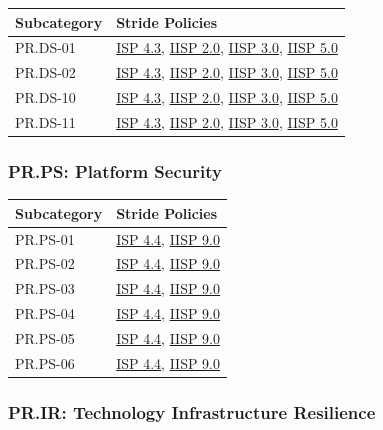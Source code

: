 \documentclass[11pt,landscape]{article}
\begin{document}
\begin{tabularx}{\textwidth}{|p{3.5cm}|X|}
\hline
\rowcolor{headgray} \textbf{Subcategory} & \textbf{Stride Policies} \\
\hline
PR.DS-01 & \hyperref[pol:ISP43]{ISP 4.3}, \hyperref[pol:IISP20]{IISP 2.0}, \hyperref[pol:IISP30]{IISP 3.0}, \hyperref[pol:IISP50]{IISP 5.0} \\
\hline
PR.DS-02 & \hyperref[pol:ISP43]{ISP 4.3}, \hyperref[pol:IISP20]{IISP 2.0}, \hyperref[pol:IISP30]{IISP 3.0}, \hyperref[pol:IISP50]{IISP 5.0} \\
\hline
PR.DS-10 & \hyperref[pol:ISP43]{ISP 4.3}, \hyperref[pol:IISP20]{IISP 2.0}, \hyperref[pol:IISP30]{IISP 3.0}, \hyperref[pol:IISP50]{IISP 5.0} \\
\hline
PR.DS-11 & \hyperref[pol:ISP43]{ISP 4.3}, \hyperref[pol:IISP20]{IISP 2.0}, \hyperref[pol:IISP30]{IISP 3.0}, \hyperref[pol:IISP50]{IISP 5.0} \\
\hline
\end{tabularx}

\subsubsection{PR.PS: Platform Security}

\begin{tabularx}{\textwidth}{|p{3.5cm}|X|}
\hline
\rowcolor{headgray} \textbf{Subcategory} & \textbf{Stride Policies} \\
\hline
PR.PS-01 & \hyperref[pol:ISP44]{ISP 4.4}, \hyperref[pol:IISP90]{IISP 9.0} \\
\hline
PR.PS-02 & \hyperref[pol:ISP44]{ISP 4.4}, \hyperref[pol:IISP90]{IISP 9.0} \\
\hline
PR.PS-03 & \hyperref[pol:ISP44]{ISP 4.4}, \hyperref[pol:IISP90]{IISP 9.0} \\
\hline
PR.PS-04 & \hyperref[pol:ISP44]{ISP 4.4}, \hyperref[pol:IISP90]{IISP 9.0} \\
\hline
PR.PS-05 & \hyperref[pol:ISP44]{ISP 4.4}, \hyperref[pol:IISP90]{IISP 9.0} \\
\hline
PR.PS-06 & \hyperref[pol:ISP44]{ISP 4.4}, \hyperref[pol:IISP90]{IISP 9.0} \\
\hline
\end{tabularx}

\subsubsection{PR.IR: Technology Infrastructure Resilience}
\end{document}
